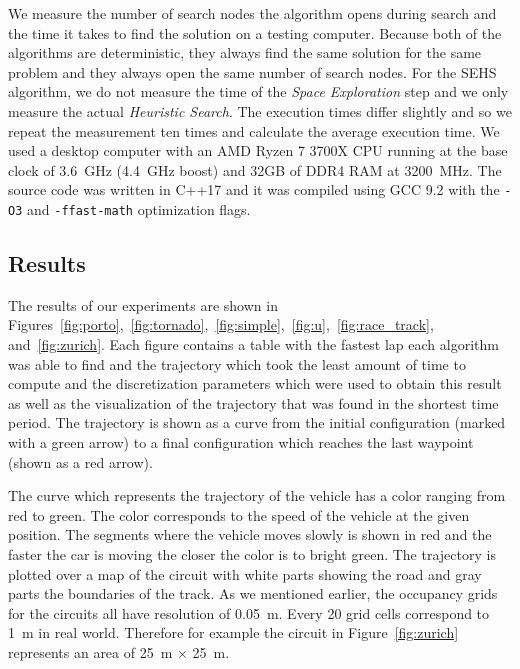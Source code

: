 We measure the number of search nodes the algorithm opens during search and the time it takes to find the solution on a testing computer. Because both of the algorithms are deterministic, they always find the same solution for the same problem and they always open the same number of search nodes. For the SEHS algorithm, we do not measure the time of the \textit{Space Exploration} step and we only measure the actual \textit{Heuristic Search}. The execution times differ slightly and so we repeat the measurement ten times and calculate the average execution time. We used a desktop computer with an AMD Ryzen 7 3700X CPU running at the base clock of \SI{3.6}{\giga\hertz} (\SI{4.4}{\giga\hertz} boost) and \num{32}GB of DDR4 RAM at \SI{3200}{\mega\hertz}. The source code was written in C++17 and it was compiled using GCC 9.2 with the \texttt{-O3} and \texttt{-ffast-math} optimization flags.

\subsection{Results}

The results of our experiments are shown in Figures~\ref{fig:porto},~\ref{fig:tornado},~\ref{fig:simple},~\ref{fig:u},~\ref{fig:race_track}, and~\ref{fig:zurich}. Each figure contains a table with the fastest lap each algorithm was able to find and the trajectory which took the least amount of time to compute and the discretization parameters which were used to obtain this result as well as the visualization of the trajectory that was found in the shortest time period. The trajectory is shown as a curve from the initial configuration (marked with a green arrow) to a final configuration which reaches the last waypoint (shown as a red arrow).

The curve which represents the trajectory of the vehicle has a color ranging from red to green. The color corresponds to the speed of the vehicle at the given position. The segments where the vehicle moves slowly is shown in red and the faster the car is moving the closer the color is to bright green. The trajectory is plotted over a map of the circuit with white parts showing the road and gray parts the boundaries of the track. As we mentioned earlier, the occupancy grids for the circuits all have resolution of \SI{0.05}{\meter}. Every \num{20} grid cells correspond to \SI{1}{\meter} in real world. Therefore for example the circuit in Figure~\ref{fig:zurich} represents an area of \SI{25}{\meter} $\times$ \SI{25}{\meter}.

